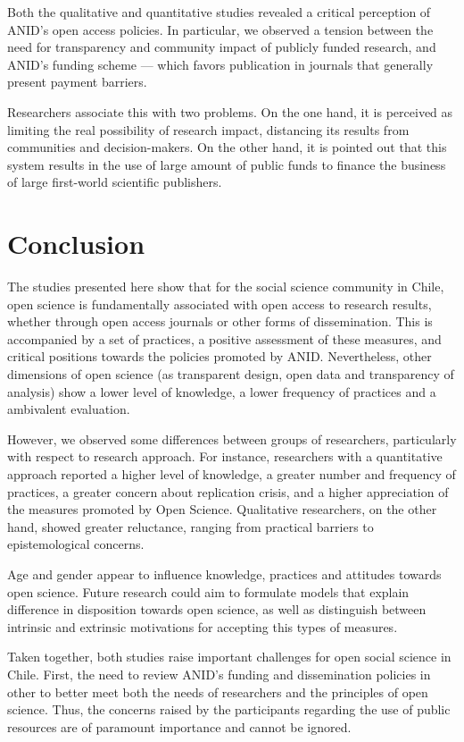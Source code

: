 \documentclass[
  letterpaper,
]{article}
\begin{document}
Both the qualitative and quantitative studies revealed a critical
perception of ANID's open access policies. In particular, we observed a
tension between the need for transparency and community impact of
publicly funded research, and ANID's funding scheme --- which favors
publication in journals that generally present payment barriers.

Researchers associate this with two problems. On the one hand, it is
perceived as limiting the real possibility of research impact,
distancing its results from communities and decision-makers. On the
other hand, it is pointed out that this system results in the use of
large amount of public funds to finance the business of large
first-world scientific publishers.

\section{Conclusion}\label{conclusion}

The studies presented here show that for the social science community in
Chile, open science is fundamentally associated with open access to
research results, whether through open access journals or other forms of
dissemination. This is accompanied by a set of practices, a positive
assessment of these measures, and critical positions towards the
policies promoted by ANID. Nevertheless, other dimensions of open
science (as transparent design, open data and transparency of analysis)
show a lower level of knowledge, a lower frequency of practices and a
ambivalent evaluation.

However, we observed some differences between groups of researchers,
particularly with respect to research approach. For instance,
researchers with a quantitative approach reported a higher level of
knowledge, a greater number and frequency of practices, a greater
concern about replication crisis, and a higher appreciation of the
measures promoted by Open Science. Qualitative researchers, on the other
hand, showed greater reluctance, ranging from practical barriers to
epistemological concerns.

Age and gender appear to influence knowledge, practices and attitudes
towards open science. Future research could aim to formulate models that
explain difference in disposition towards open science, as well as
distinguish between intrinsic and extrinsic motivations for accepting
this types of measures.

Taken together, both studies raise important challenges for open social
science in Chile. First, the need to review ANID's funding and
dissemination policies in other to better meet both the needs of
researchers and the principles of open science. Thus, the concerns
raised by the participants regarding the use of public resources are of
paramount importance and cannot be ignored.
\end{document}
